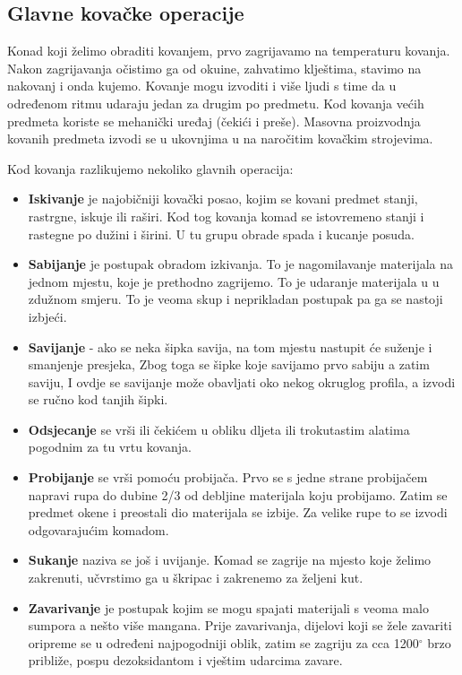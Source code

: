 \documentclass[a4paper,12pt]{article}
\numberwithin{figure}{section}
\begin{document}
\subsection{Glavne kovačke operacije}
Konad koji želimo obraditi kovanjem, prvo zagrijavamo na temperaturu kovanja. Nakon zagrijavanja očistimo ga od okuine, zahvatimo klještima, stavimo na nakovanj i onda kujemo. Kovanje mogu izvoditi i više ljudi s time da u određenom ritmu udaraju jedan za drugim po predmetu. Kod kovanja većih predmeta koriste se mehanički uređaj (čekići i preše). Masovna proizvodnja kovanih predmeta izvodi se u ukovnjima u na naročitim kovačkim strojevima.\par
Kod kovanja razlikujemo nekoliko glavnih operacija:
\begin{itemize}
\item \textbf{Iskivanje} je najobičniji kovački posao, kojim se kovani predmet stanji, rastrgne, iskuje ili raširi. Kod tog kovanja komad se istovremeno stanji i rastegne po dužini i širini. U tu grupu obrade spada i kucanje posuda.
\item \textbf{Sabijanje} je postupak obradom izkivanja. To je nagomilavanje materijala na jednom mjestu, koje je prethodno zagrijemo. To je udaranje materijala u u zdužnom smjeru. To je veoma skup i neprikladan postupak pa ga se nastoji izbjeći.
\item \textbf{Savijanje} - ako se neka šipka savija, na tom mjestu nastupit će suženje i smanjenje presjeka, Zbog toga se šipke koje savijamo prvo sabiju a zatim saviju, I ovdje se savijanje može obavljati oko nekog okruglog profila, a izvodi se ručno kod tanjih šipki.
\item \textbf{Odsjecanje} se vrši ili čekićem u obliku dljeta ili trokutastim alatima pogodnim za tu vrtu kovanja.
\item \textbf{Probijanje} se vrši pomoću probijača. Prvo se s jedne strane probijačem napravi rupa do dubine 2/3 od debljine materijala koju probijamo. Zatim se predmet okene i preostali dio materijala se izbije. Za velike rupe to se izvodi odgovarajućim komadom.
\item \textbf{Sukanje} naziva se još i uvijanje. Komad se zagrije na mjesto koje želimo zakrenuti, učvrstimo ga u škripac i zakrenemo za željeni kut.
\item \textbf{Zavarivanje} je postupak kojim se mogu spajati materijali s veoma malo sumpora a nešto više mangana. Prije zavarivanja, dijelovi koji se žele zavariti oripreme se u određeni najpogodniji oblik, zatim se zagriju za cca 1200$^{\circ}$ brzo približe, pospu dezoksidantom i vještim udarcima zavare.

\end{itemize}
\end{document}

